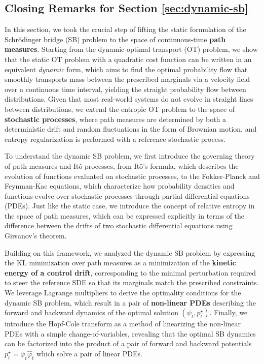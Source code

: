 \documentclass{article}
\begin{document}
\subsection{Closing Remarks for Section \ref{sec:dynamic-sb}}
In this section, we took the crucial step of lifting the static formulation of the Schrödinger bridge (SB) problem to the space of continuous-time \textbf{path measures}. Starting from the dynamic optimal transport (OT) problem, we show that the static OT problem with a quadratic cost function can be written in an equivalent \textit{dynamic} form, which aims to find the optimal probability flow that smoothly transports mass between the prescribed marginals via a velocity field over a continuous time interval, yielding the straight probability flow between distributions. Given that most real-world systems do not evolve in straight lines between distributions, we extend the entropic OT problem to the space of \textbf{stochastic processes}, where path measures are determined by both a deterministic drift and random fluctuations in the form of Brownian motion, and entropy regularization is performed with a reference stochastic process.

To understand the dynamic SB problem, we first introduce the governing theory of path measures and Itô processes, from Itô's formula, which describes the evolution of functions evaluated on stochastic processes, to the Fokker-Planck and Feynman-Kac equations, which characterize how probability densities and functions evolve over stochastic processes through partial differential equations (PDEs). Just like the static case, we introduce the concept of relative entropy in the space of path measures, which can be expressed explicitly in terms of the difference between the drifts of two stochastic differential equations using Girsanov's theorem. 

Building on this framework, we analyzed the dynamic SB problem by expressing the KL minimization over path measures as a minimization of the \textbf{kinetic energy of a control drift}, corresponding to the minimal perturbation required to steer the reference SDE so that its marginals match the prescribed constraints. We leverage Lagrange multipliers to derive the optimality conditions for the dynamic SB problem, which result in a pair of \textbf{non-linear PDEs} describing the forward and backward dynamics of the optimal solution $(\psi_t, p^\star_t)$. Finally, we introduce the Hopf-Cole transform as a method of linearizing the non-linear PDEs with a simple change-of-variables, revealing that the optimal SB dynamics can be factorized into the product of a pair of forward and backward potentials $p_t^\star=\varphi_t\hat\varphi_t$ which solve a pair of linear PDEs. 
\end{document}
